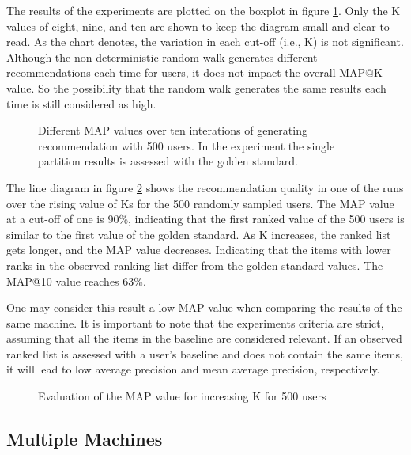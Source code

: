The results of the experiments are plotted on the boxplot in figure \ref{plot:single-partition-boxplot}. Only the K values of eight, nine, and ten are shown to keep the diagram small and clear to read. As the chart denotes, the variation in each cut-off (i.e., K) is not significant. Although the non-deterministic random walk generates different recommendations each time for users, it does not impact the overall MAP@K value. So the possibility that the random walk generates the same results each time is still considered as high.


\begin{figure}[!htb]
    \centering
    
    \caption{Different MAP values over ten interations of generating recommendation with 500 users. In the experiment the single partition results is assessed with the golden standard.}
    \label{plot:single-partition-boxplot}
\end{figure}



The line diagram in figure \ref{plot:single-partition} shows the recommendation quality in one of the runs over the rising value of Ks for the 500 randomly sampled users. The MAP value at a cut-off of one is 90\%, indicating that the first ranked value of the 500 users is similar to the first value of the golden standard. As K increases, the ranked list gets longer, and the MAP value decreases. Indicating that the items with lower ranks in the observed ranking list differ from the golden standard values. The MAP@10 value reaches 63\%. 


One may consider this result a low MAP value when comparing the results of the same machine. It is important to note that the experiments criteria are strict, assuming that all the items in the baseline are considered relevant. If an observed ranked list is assessed with a user's baseline and does not contain the same items, it will lead to low average precision and mean average precision, respectively.

\begin{figure}[!htb]
    \centering
    
    \caption{Evaluation of the MAP value for increasing K for 500 users}
    \label{plot:single-partition}
\end{figure}

\subsection{Multiple Machines}
\label{subsec:eval-multiple-machines}

